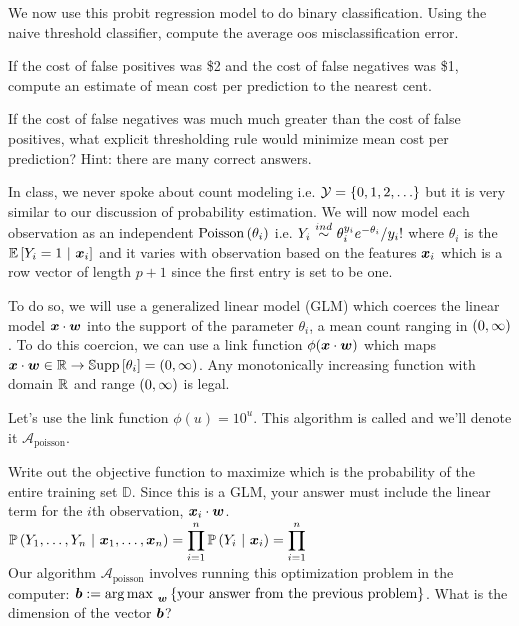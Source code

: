 \documentclass[12pt]{article}
\begin{document}
 We now use this probit regression model to do binary classification. Using the naive threshold classifier, compute the average oos misclassification error. 

 If the cost of false positives was \$2 and the cost of false negatives was \$1, compute an estimate of mean cost per prediction to the nearest cent. 

 If the cost of false negatives was much much greater than the cost of false positives, what explicit thresholding rule would minimize mean cost per prediction? Hint: there are many correct answers. 

\eenum


\problem In class, we never spoke about count modeling i.e. $\mathcal{Y} = \left\{0,1, 2, \ldots\right\}$ but it is very similar to our discussion of probability estimation. We will now model each observation as an independent $\mathrm{Poisson}\left(\theta_i\right)$ i.e. $Y_i \inddist \theta_i^{y_i} e^{-\theta_i} / y_i!$ where $\theta_i$ is the $\mathbb{E}\left[Y_i = 1~|~\boldsymbol{x}_i\right]$ and it varies with observation based on the features $\boldsymbol{x}_i$ which is a row vector of length $p+1$ since the first entry is set to be one. 

To do so, we will use a generalized linear model (GLM) which coerces the linear model $\boldsymbol{x} \cdot \boldsymbol{w}$ into the support of the parameter $\theta_i$, a mean count ranging in $\left(0, \infty\right)$. To do this coercion, we can use a link function $\phi(\boldsymbol{x} \cdot \boldsymbol{w})$ which maps $\boldsymbol{x} \cdot \boldsymbol{w} \in \mathbb{R} \rightarrow \mathbb{S}\text{upp}\left[\theta_i\right] = \left(0, \infty\right)$. Any monotonically increasing function with domain $\mathbb{R}$ and range $\left(0, \infty\right)$ is legal.

Let's use the link function $\phi(u) = 10^u$. This algorithm is called  and we'll denote it $\mathcal{A}_{\text{poisson}}$.

\benum
{} Write out the objective function to maximize which is the probability of the entire training set $\mathbb{D}$. Since this is a GLM, your answer must include the linear term for the $i$th observation, $\boldsymbol{x}_i \cdot \boldsymbol{w}$. \\

$\mathbb{P}\left(Y_1, \ldots, Y_n~|~\boldsymbol{x}_1, \ldots, \boldsymbol{x}_n\right) = \displaystyle\prod_{i=1}^n \mathbb{P}\left(Y_i~|~\boldsymbol{x}_i\right) = \prod_{i=1}^n $\\

 Our algorithm $\mathcal{A}_{\text{poisson}}$ involves running this optimization problem in the computer: $\boldsymbol{b} := \operatorname*{arg\,max~}_{\boldsymbol{w}} \left\{\text{your answer from the previous problem}\right\}$. What is the dimension of the vector $\boldsymbol{b}$?
\end{document}
